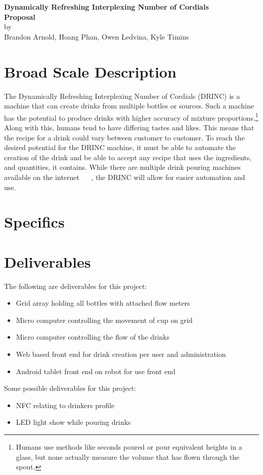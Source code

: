 \documentclass[letterpaper]{article}
\newcommand{\theTitle}{Dynamically Refreshing Interplexing Number of Cordials}
\newcommand{\subTitle}{DRINC}
\newcommand{\fNames}{Brandon Arnold, Hoang Phan, Owen Ledvina, Kyle Timins}
\begin{document}
\thispagestyle{plain}
\begin{center}
{\LARGE \textbf{\theTitle}}\\\vspace{0.5cm}
{\Large \textbf{Proposal}}\\\vspace{0.5cm}
by\\
{\large \fNames}

\end{center}

\section{Broad Scale Description}

The \theTitle{} (\subTitle{}) is a machine that can create drinks from
multiple bottles or sources. Such a machine has the potential to produce
drinks with higher accuracy of mixture proportions.\footnote{Humans use
methods like seconds poured or pour equivalent heights in a glass, but 
none actually measure the volume that has flown through the spout.} Along
with this, humans tend to have differing tastes and likes. This means
that the recipe for a drink could vary between customer to customer.
To reach the desired potential for the \subTitle{} machine, it must be 
able to automate the creation of the drink and be able to accept any recipe
that uses the ingredients, and quantities, it contains. While there are
multiple drink pouring machines available on the internet ~\cite{BaR2D2}
~\cite{Inebriator}, the \subTitle{} will allow for easier automation and
use.


\section{Specifics}

\section{Deliverables}

The following are deliverables for this project:
\begin{itemize}
    \item Grid array holding all bottles with attached flow meters
    \item Micro computer controlling the movement of cup on grid
    \item Micro computer controlling the flow of the drinks
    \item Web based front end for drink creation per user and 
          administration
    \item Android tablet front end on robot for use front end    \end{itemize}

Some possible deliverables for this project:
\begin{itemize}
    \item NFC relating to drinkers profile
    \item LED light show while pouring drinks
\end{itemize}    



\end{document}
